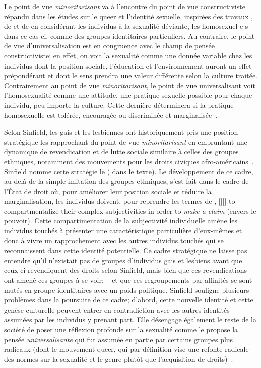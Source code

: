 Le point de vue \emph{minoritarisant} va à l'encontre du point de vue constructiviste répandu dans les études sur le queer et l'identité sexuelle, inspirées des travaux \citet{Foucault2011}, de \citet{Rubin2010} et de \citet{Butler2007} en considérant les individus à la sexualité déviante, les homosexuel-e-s dans ce cas-ci, comme des groupes identitaires particuliers. 
Au contraire, le point de vue d'universalisation est en congruence avec le champ de pensée constructiviste; en effet, on voit la sexualité comme une donnée variable chez les individus dont la position sociale, l'éducation et l'environnement auront un effet prépondérant et dont le sens prendra une valeur différente selon la culture traitée. 
Contrairement au point de vue \emph{minoritarisant}, le point de vue universalisant voit l'homosexualité comme une attitude, une pratique sexuelle possible pour chaque individu, peu importe la culture. 
Cette dernière déterminera si la pratique homosexuelle est tolérée, encouragée ou discriminée et marginalisée~\citep[271]{Sinfield1996}.

Selon Sinfield, les gais et les lesbiennes ont historiquement pris une position stratégique les rapprochant du point de vue \emph{minoritarisant} en empruntant une dynamique de revendication et de lutte sociale similaire à celles des groupes ethniques, notamment des mouvements pour les droits civiques afro-américains~\citep[271]{Sinfield1996}. 
Sinfield nomme cette stratégie le  ( dans le texte). 
Le développement de ce cadre, au-delà de la simple imitation des groupes ethniques, s'est fait dans le cadre de l'État de droit où, pour améliorer leur position sociale et réduire la marginalisation, les individus doivent, pour reprendre les termes de \citet{Sinfield1996}, [{\citeyear[272]{Sinfield1996}}][]{\textelp{} to   compartmentalize their complex subjectivities in order to \emph{make a claim} (envers le pouvoir)}.
Cette compartimentation de la subjectivité individuelle amène les individus touchés à présenter une caractéristique particulière d'eux-mêmes et donc à vivre un rapprochement avec les autres individus touchés qui se reconnaissent dans cette identité potentielle. 
Ce cadre stratégique ne laisse pas entendre qu'il n'existait pas de groupes d'individus gais et lesbiens avant que ceux-ci revendiquent des droits selon Sinfield, mais bien que ces revendications ont amené ces groupes à se voir:  ~\citep[272]{Sinfield1996} et que ces regroupements par affinités se sont mutés en groupe identitaires avec un poids politique. 
Sinfield souligne plusieurs problèmes dans la poursuite de ce cadre; d'abord, cette nouvelle identité et cette genèse culturelle peuvent entrer en contradiction avec les autres identités assumées par les individus y prenant part. 
Elle désengage également le reste de la société de poser une réflexion profonde sur la sexualité comme le propose la pensée \emph{universalisante} qui fut assumée en partie par certains groupes plus radicaux (dont le mouvement queer, qui par définition vise une refonte radicale des normes sur la sexualité et le genre plutôt que l'acquisition de droits)~\citep[273]{Sinfield1996}.

